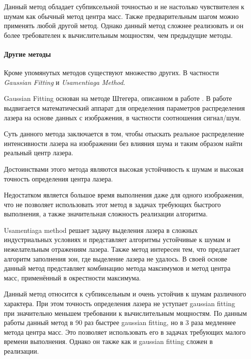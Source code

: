                 Данный метод обладает субпиксельной точностью и не настолько чувствителен к шумам как обычный метод центра масс. Также предварительным шагом можно применять любой другой метод. Однако данный метод сложнее реализовать и он более требователен к вычислительным мощностям, чем предыдущие методы.
                
            \paragraph{Другие методы}
                Кроме упомянутых методов существуют множество других. В частности \textit{Gaussian Fitting}\cite{Qi2013} и \textit{Usamentiaga Method}\cite{Usamentiaga2012}.
                
                Gaussian Fitting основан на методе Штегера, описанном в работе \cite{Steger2000}. В работе \cite{Qi2013} выдвигается математический аппарат для определения параметров распределения лазера на основе данных с изображения, в частности соотношения сигнал/шум.
                
                Суть данного метода заключается в том, чтобы отыскать реальное распределение интенсивности лазера на изображении без влияния шума и таким образом найти реальный центр лазера.
                
                Достоинствами этого метода являются высокая устойчивость к шумам и высокая точность определения центра лазера.
                
                Недостатком является большое время выполнения даже для одного изображения, что не позволяет использовать этот метод в задачах требующих быстрого выполнения, а также значительная сложность реализации алгоритма.
                
                Usamentiaga method решает задачу выделения лазера в сложных индустриальных условиях и представляет алгоритмы устойчивые к шумам и нежелательным отражениям лазера. Также метод интересен тем, что предлагает алгоритм заполнения зон, где выделение лазера не удалось. В своей основе данный метод представляет комбинацию метода максимумов и метод центра масс, применённый в окрестности максимума.
                
                Данный метод относится к субпиксельным и очень устойчив к шумам различного характера. При этом точность определения лазера не уступает gaussian fitting при значительно меньшем требовании к вычислительным мощностям. По данным работы \cite{Li2017} данный метод в 90 раз быстрее gaussian fitting, но в 3 раза медленнее метода центра масс. Это позволяет использовать его в задачах требующих малого времени выполнения. Однако он также как и gaussian fitting сложен в реализации.
            
